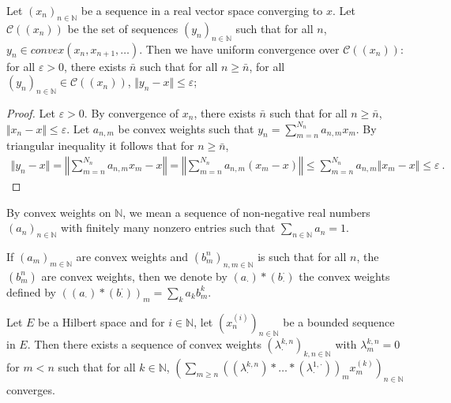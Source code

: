 \begin{lemma}\label{lem:convex_of_converg_seq_is_converg}\leanok
  Let $(x_n)_{n \in \mathbb{N}}$ be a sequence in a real vector space converging to $x$.
  Let $\mathcal{C}((x_n))$ be the set of sequences $(y_n)_{n \in \mathbb{N}}$ such that for all $n$, $y_n \in convex(x_n, x_{n+1}, \ldots)$.
  Then we have uniform convergence over $\mathcal{C}((x_n))$: for all $\varepsilon > 0$, there exists $\bar{n}$ such that for all $n \ge \bar{n}$, for all $(y_n)_{n \in \mathbb{N}} \in \mathcal{C}((x_n))$, $\Vert y_n - x \Vert \le \varepsilon$;
\end{lemma}

\begin{proof} \leanok
Let $\varepsilon>0$.
By convergence of $x_n$, there exists $\bar{n}$ such that for all $n \ge \bar{n}$, $\Vert x_n-x \Vert \le \varepsilon$.
Let $a_{n, m}$ be convex weights such that $y_n = \sum_{m = n}^{N_n} a_{n, m} x_m$.
By triangular inequality it follows that for $n \ge \bar{n}$,
\begin{align*}
  \Vert y_n - x \Vert
  = \left\Vert \sum_{m = n}^{N_n} a_{n, m} x_m - x \right\Vert
  = \left\Vert \sum_{m = n}^{N_n} a_{n, m} (x_m - x) \right\Vert
  \le \sum_{m = n}^{N_n} a_{n, m} \Vert x_m - x \Vert
  \le \varepsilon
  \: .
\end{align*}
\end{proof}

By convex weights on $\mathbb{N}$, we mean a sequence of non-negative real numbers $(a_n)_{n \in \mathbb{N}}$ with finitely many nonzero entries such that $\sum_{n \in \mathbb{N}} a_n = 1$.

\begin{definition}\label{def:convex_weights_product}
  \leanok
If $(a_m)_{m \in \mathbb{N}}$ are convex weights and $(b^n_m)_{n,m \in \mathbb{N}}$ is such that for all $n$, the $(b^n_m)$ are convex weights, then we denote by $(a_\cdot) * (b^\cdot_\cdot)$ the convex weights defined by $((a_\cdot) * (b^\cdot_\cdot))_m = \sum_{k} a_k b^k_m$.
\end{definition}


\begin{lemma}\label{lem:komlos_convex_weights}
  \leanok
Let $E$ be a Hilbert space and for $i \in \mathbb{N}$, let $(x_n^{(i)})_{n \in \mathbb{N}}$ be a bounded sequence in $E$. Then there exists a sequence of convex weights $(\lambda^{k,n}_\cdot)_{k, n \in \mathbb{N}}$ with $\lambda^{k,n}_m = 0$ for $m < n$ such that for all $k \in \mathbb{N}$, $\left(\sum_{m \ge n} \left((\lambda^{k,n}_\cdot) * \ldots * (\lambda^{1,\cdot}_\cdot)\right)_m x_m^{(k)}\right)_{n \in \mathbb{N}}$ converges.
\end{lemma}

